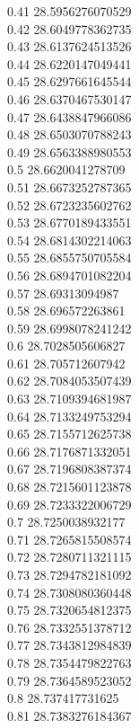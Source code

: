 {0.41	28.5956276070529\\
0.42	28.6049778362735\\
0.43	28.6137624513526\\
0.44	28.6220147049441\\
0.45	28.6297661645544\\
0.46	28.6370467530147\\
0.47	28.6438847966086\\
0.48	28.6503070788243\\
0.49	28.6563388980553\\
0.5	28.6620041278709\\
0.51	28.6673252787365\\
0.52	28.6723235602762\\
0.53	28.6770189433551\\
0.54	28.6814302214063\\
0.55	28.6855750705584\\
0.56	28.6894701082204\\
0.57	28.69313094987\\
0.58	28.696572263861\\
0.59	28.6998078241242\\
0.6	28.7028505606827\\
0.61	28.705712607942\\
0.62	28.7084053507439\\
0.63	28.7109394681987\\
0.64	28.7133249753294\\
0.65	28.7155712625738\\
0.66	28.7176871332051\\
0.67	28.7196808387374\\
0.68	28.7215601123878\\
0.69	28.7233322006729\\
0.7	28.7250038932177\\
0.71	28.7265815508574\\
0.72	28.7280711321115\\
0.73	28.7294782181092\\
0.74	28.7308080360448\\
0.75	28.7320654812375\\
0.76	28.7332551378712\\
0.77	28.7343812984839\\
0.78	28.7354479822763\\
0.79	28.7364589523052\\
0.8	28.737417731625\\
0.81	28.7383276184367\\
}
